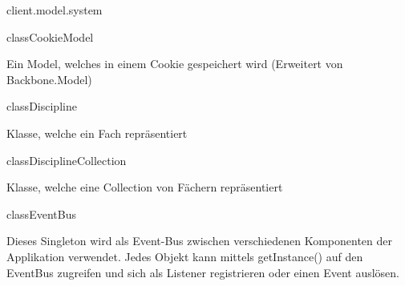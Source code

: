 \begin{texdocpackage}{client.model.system}
\label{texdoclet:edu.kit.informatik.studyplan.client.model.system}

\begin{texdocclass}{class}{CookieModel}
\label{texdoclet:edu.kit.informatik.studyplan.client.model.system.CookieModel}
\begin{texdocclassintro}
Ein Model, welches in einem Cookie gespeichert wird (Erweitert von
 Backbone.Model)\end{texdocclassintro}
\begin{texdocclassconstructors}
\end{texdocclassconstructors}
\end{texdocclass}


\begin{texdocclass}{class}{Discipline}
\label{texdoclet:edu.kit.informatik.studyplan.client.model.system.Discipline}
\begin{texdocclassintro}
Klasse, welche ein Fach repräsentiert\end{texdocclassintro}
\begin{texdocclassconstructors}
\end{texdocclassconstructors}
\end{texdocclass}


\begin{texdocclass}{class}{DisciplineCollection}
\label{texdoclet:edu.kit.informatik.studyplan.client.model.system.DisciplineCollection}
\begin{texdocclassintro}
Klasse, welche eine Collection von Fächern repräsentiert\end{texdocclassintro}
\begin{texdocclassconstructors}
\end{texdocclassconstructors}
\end{texdocclass}


\begin{texdocclass}{class}{EventBus}
\label{texdoclet:edu.kit.informatik.studyplan.client.model.system.EventBus}
\begin{texdocclassintro}
Dieses Singleton wird als Event-Bus zwischen verschiedenen Komponenten der
 Applikation verwendet. Jedes Objekt kann mittels getInstance() auf den
 EventBus zugreifen und sich als Listener registrieren oder einen Event
 auslösen.\texdocbr{}


\end{texdocclassintro}
\end{texdocclass}
\end{texdocpackage}

